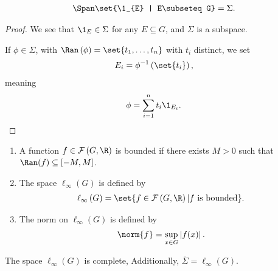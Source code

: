 \documentclass[10pt]{mypackage}
\begin{document}
\begin{fact}
  \begin{align*}
    \Span\set{\1_{E} | E\subseteq G} &= \Sigma.
  \end{align*}
\end{fact}
\begin{proof}
  We see that $\1_{E}\in \Sigma$ for any $E\subseteq G$, and $\Sigma$ is a subspace.\newline

  If $\phi\in \Sigma$, with $\Ran\left(\phi\right) = \set{t_1,\dots,t_n}$ with $t_i$ distinct, we set
  \begin{align*}
    E_i &= \phi^{-1}\left(\set{t_i}\right),
  \end{align*}
  meaning
  \begin{align*}
    \phi &= \sum_{i=1}^{n}t_i\1_{E_i}.
  \end{align*}
\end{proof}
\begin{definition}\hfill
  \begin{enumerate}[(1)]
    \item A function $f\in \mathcal{F}\left(G,\R\right)$ is bounded if there exists $M > 0$ such that $\Ran(f) \subseteq \left[-M,M\right]$.
    \item The space $\ell_{\infty}(G)$ is defined by
      \begin{align*}
        \ell_{\infty}\left(G\right) &= \set{f\in \mathcal{F}\left(G,\R\right) | f\text{ is bounded}}.
      \end{align*}
    \item The norm on $\ell_{\infty}(G)$ is defined by
      \begin{align*}
        \norm{f} &= \sup_{x\in G}\left\vert f(x) \right\vert.
      \end{align*}
  \end{enumerate}
\end{definition}
\begin{proposition}
  The space $\ell_{\infty}(G)$ is complete, Additionally, $\overline{\Sigma} = \ell_{\infty}\left(G\right)$.
\end{proposition}
\end{document}
